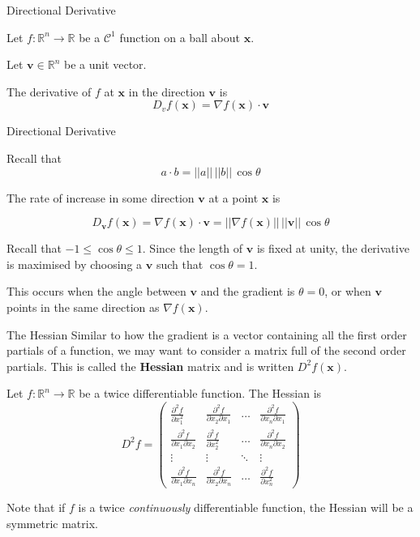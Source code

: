 \documentclass[11pt, xcolor={dvipsnames}, hyperref={colorlinks, allcolors=Blue}]{beamer}
\newcommand\bc[1]{{\usebeamercolor[fg]{frametitle} {\textbf{#1}}}} %
\newcommand{\into}{\rightarrow}
\newcommand{\R}{\mathbb{R}}
\newcommand{\x}{\mathbf{x}}
\renewcommand{\v}{\mathbf{v}}
\begin{document}
\begin{frame}{Directional Derivative}

Let $f:\R^{n}\into\R$ be a $\mathcal{C}^{1}$ function on a ball about $\x$. \bigskip

Let $\v \in \R^{n}$ be a unit vector.\bigskip

 The derivative of $f$ at $\x$ in the direction $\v$ is
\[D_{v}f(\x) = \nabla f(\x) \cdot \v\]
\vfill\vfill
\end{frame}
\begin{frame}{Directional Derivative}

 Recall that
\[a \cdot b = ||a|| \, ||b|| \, \cos \theta\]
\bigskip

The rate of increase in some direction $\v$ at a point $\x$ is

\[D_{\v}f(\x) = \nabla f(\x)\cdot \v = ||\nabla f(\x)|| \, ||\v||\, \cos \theta\]
\medskip

Recall that $-1 \leq \cos \theta \leq 1$. Since the length of $\v$ is fixed at unity, the derivative is maximised by choosing a $\v$ such that $\cos \theta = 1$.\bigskip

 This occurs when the angle between $\v$ and the gradient is $\theta = 0$, or when $\v$ points in the same direction as $\nabla f(\x)$.\\
\end{frame}
\begin{frame}{The Hessian}
Similar to how the gradient is a vector containing all the first order partials of a function, we may want to consider a matrix full of the second order partials. This is called the \bc{Hessian} matrix and is written $D^{2}f(\x)$.\bigskip


Let $f:\R^{n}\into\R$ be a twice differentiable function. The Hessian is
\large
\[D^{2}f = 
\begin{pmatrix}
\frac{\partial^{2}f}{\partial x_{1}^{2}} & \frac{\partial^{2} f}{\partial x_{2}\partial x_{1}} & \dots & \frac{\partial^{2} f}{\partial x_{n} \partial x_{1}}\\
\frac{\partial^{2} f}{\partial x_{1}\partial x_{2}} & \frac{\partial^{2} f}{\partial x_{2}^{2}} & \dots & \frac{\partial^{2} f}{\partial x_{n}\partial x_{2}}\\
\vdots & \vdots & \ddots & \vdots\\
\frac{\partial^{2} f}{\partial x_{1} \partial x_{n}} & \frac{\partial^{2} f}{\partial x_{2} \partial x_{n}} & \dots & \frac{\partial^{2} f}{\partial x_{n}^{2}}
\end{pmatrix}
\]
\normalsize
\medskip

Note that if $f$ is a twice \emph{continuously} differentiable function, the Hessian will be a symmetric matrix.


\end{frame}
\end{document}
